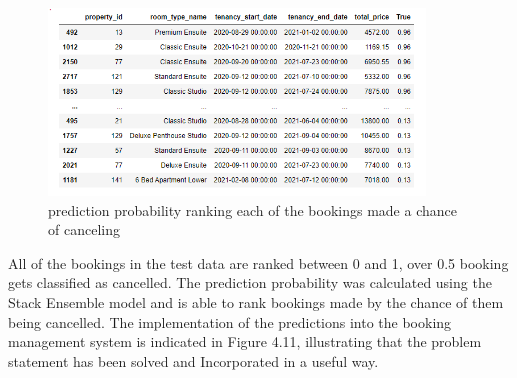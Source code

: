 \begin{figure}[H]
 \includegraphics[width=10cm]{figures/canc_prob.png}
 \caption{prediction probability ranking each of the bookings made a chance of canceling}
\end{figure}
All of the bookings in the test data are ranked between 0 and 1, over 0.5 booking gets classified as cancelled. The prediction probability was calculated using the Stack Ensemble model and is able to rank bookings made by the chance of them being cancelled. The implementation of the predictions into the booking management system is indicated in Figure 4.11, illustrating that the problem statement has been solved and Incorporated in a useful way. 



